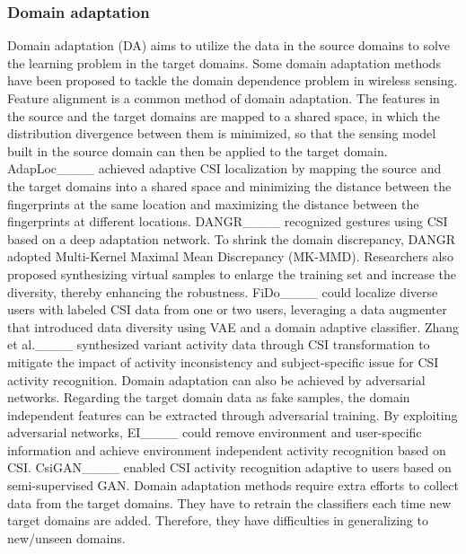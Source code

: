 \subsubsection{Domain adaptation}
Domain adaptation (DA) aims to utilize the data in the source domains to solve the learning problem in the target domains. Some domain adaptation methods have been proposed to tackle the domain dependence problem in wireless sensing.
%
Feature alignment is a common method of domain adaptation. The features in the source and the target domains are mapped to a shared space, in which the distribution divergence between them is minimized, so that the sensing model built in the source domain can then be applied to the target domain. AdapLoc____ achieved adaptive CSI localization by mapping the source and the target domains into a shared space and minimizing the distance between the fingerprints at the same location and maximizing the distance between the fingerprints at different locations. DANGR____ recognized gestures using CSI based on a deep adaptation network. To shrink the domain discrepancy, DANGR adopted Multi-Kernel Maximal Mean Discrepancy (MK-MMD).
%
Researchers also proposed synthesizing virtual samples to enlarge the training set and increase the diversity, thereby enhancing the robustness. FiDo____ could localize diverse users with labeled CSI data from one or two users, leveraging a data augmenter that introduced data diversity using VAE and a domain adaptive classifier. Zhang et al.____ synthesized variant activity data through CSI transformation to mitigate the impact of activity inconsistency and subject-specific issue for CSI activity recognition. 
%
Domain adaptation can also be achieved by adversarial networks. Regarding the target domain data as fake samples, the domain independent features can be extracted through adversarial training. By exploiting adversarial networks, EI____ could remove environment and user-specific information and achieve environment independent activity recognition based on CSI. CsiGAN____ enabled CSI activity recognition adaptive to users based on semi-supervised GAN. 
%
Domain adaptation methods require extra efforts to collect data from the target domains. They have to retrain the classifiers each time new target domains are added. Therefore, they have difficulties in generalizing to new/unseen domains.  

